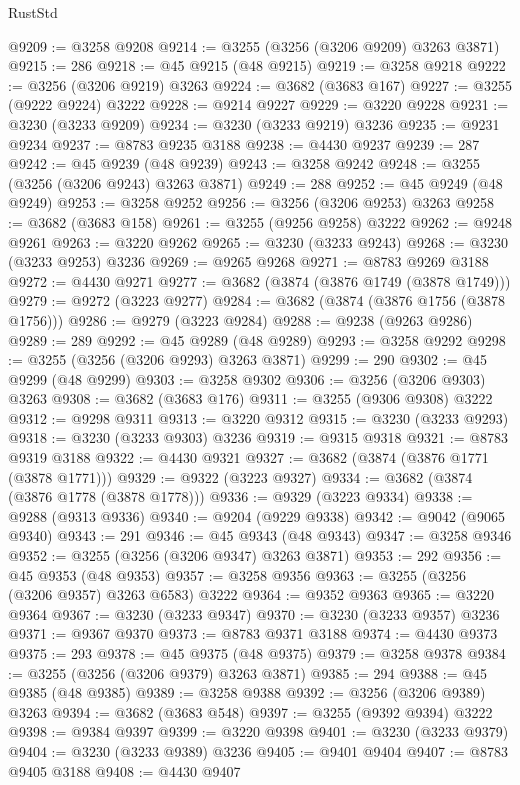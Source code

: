 \begin{lexlean}{RustStd}
\begin{coremodule}
@9209 := @3258 @9208
@9214 := @3255 (@3256 (@3206 @9209) @3263 @3871)
@9215 := 286
@9218 := @45 @9215 (@48 @9215)
@9219 := @3258 @9218
@9222 := @3256 (@3206 @9219) @3263
@9224 := @3682 (@3683 @167)
@9227 := @3255 (@9222 @9224) @3222
@9228 := @9214 @9227
@9229 := @3220 @9228
@9231 := @3230 (@3233 @9209)
@9234 := @3230 (@3233 @9219) @3236
@9235 := @9231 @9234
@9237 := @8783 @9235 @3188
@9238 := @4430 @9237
@9239 := 287
@9242 := @45 @9239 (@48 @9239)
@9243 := @3258 @9242
@9248 := @3255 (@3256 (@3206 @9243) @3263 @3871)
@9249 := 288
@9252 := @45 @9249 (@48 @9249)
@9253 := @3258 @9252
@9256 := @3256 (@3206 @9253) @3263
@9258 := @3682 (@3683 @158)
@9261 := @3255 (@9256 @9258) @3222
@9262 := @9248 @9261
@9263 := @3220 @9262
@9265 := @3230 (@3233 @9243)
@9268 := @3230 (@3233 @9253) @3236
@9269 := @9265 @9268
@9271 := @8783 @9269 @3188
@9272 := @4430 @9271
@9277 := @3682 (@3874 (@3876 @1749 (@3878 @1749)))
@9279 := @9272 (@3223 @9277)
@9284 := @3682 (@3874 (@3876 @1756 (@3878 @1756)))
@9286 := @9279 (@3223 @9284)
@9288 := @9238 (@9263 @9286)
@9289 := 289
@9292 := @45 @9289 (@48 @9289)
@9293 := @3258 @9292
@9298 := @3255 (@3256 (@3206 @9293) @3263 @3871)
@9299 := 290
@9302 := @45 @9299 (@48 @9299)
@9303 := @3258 @9302
@9306 := @3256 (@3206 @9303) @3263
@9308 := @3682 (@3683 @176)
@9311 := @3255 (@9306 @9308) @3222
@9312 := @9298 @9311
@9313 := @3220 @9312
@9315 := @3230 (@3233 @9293)
@9318 := @3230 (@3233 @9303) @3236
@9319 := @9315 @9318
@9321 := @8783 @9319 @3188
@9322 := @4430 @9321
@9327 := @3682 (@3874 (@3876 @1771 (@3878 @1771)))
@9329 := @9322 (@3223 @9327)
@9334 := @3682 (@3874 (@3876 @1778 (@3878 @1778)))
@9336 := @9329 (@3223 @9334)
@9338 := @9288 (@9313 @9336)
@9340 := @9204 (@9229 @9338)
@9342 := @9042 (@9065 @9340)
@9343 := 291
@9346 := @45 @9343 (@48 @9343)
@9347 := @3258 @9346
@9352 := @3255 (@3256 (@3206 @9347) @3263 @3871)
@9353 := 292
@9356 := @45 @9353 (@48 @9353)
@9357 := @3258 @9356
@9363 := @3255 (@3256 (@3206 @9357) @3263 @6583) @3222
@9364 := @9352 @9363
@9365 := @3220 @9364
@9367 := @3230 (@3233 @9347)
@9370 := @3230 (@3233 @9357) @3236
@9371 := @9367 @9370
@9373 := @8783 @9371 @3188
@9374 := @4430 @9373
@9375 := 293
@9378 := @45 @9375 (@48 @9375)
@9379 := @3258 @9378
@9384 := @3255 (@3256 (@3206 @9379) @3263 @3871)
@9385 := 294
@9388 := @45 @9385 (@48 @9385)
@9389 := @3258 @9388
@9392 := @3256 (@3206 @9389) @3263
@9394 := @3682 (@3683 @548)
@9397 := @3255 (@9392 @9394) @3222
@9398 := @9384 @9397
@9399 := @3220 @9398
@9401 := @3230 (@3233 @9379)
@9404 := @3230 (@3233 @9389) @3236
@9405 := @9401 @9404
@9407 := @8783 @9405 @3188
@9408 := @4430 @9407

\end{coremodule}
\end{lexlean}
